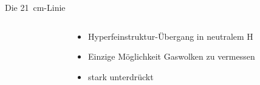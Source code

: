\documentclass[compress, aspectratio=169]{beamer}
\begin{document}
\begin{frame}{Die \SI{21}{\centi\meter}-Linie}
  \begin{columns}[c]%
    \begin{column}{0.6\textwidth}%
      
    \end{column}%
    \begin{column}{0.4\textwidth}%
      \begin{itemize}
        \item Hyperfeinstruktur-Übergang in neutralem H
        \item Einzige Möglichkeit Gaswolken zu vermessen
        \item stark unterdrückt
      \end{itemize}
    \end{column}%
  \end{columns}%
\end{frame}
\end{document}
